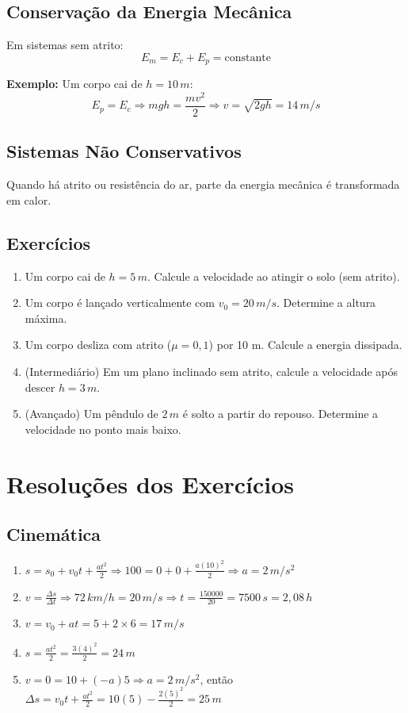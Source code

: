 \documentclass[a4paper,12pt]{article}
\begin{document}
\subsection{Conservação da Energia Mecânica}
Em sistemas sem atrito:
\[
E_m = E_c + E_p = \text{constante}
\]

\textbf{Exemplo:} Um corpo cai de $h=10\,m$:
\[
E_p = E_c \Rightarrow mgh = \frac{mv^2}{2} \Rightarrow v = \sqrt{2gh} = 14\,m/s
\]

\subsection{Sistemas Não Conservativos}
Quando há atrito ou resistência do ar, parte da energia mecânica é transformada em calor.

\subsection{Exercícios}
\begin{enumerate}
\item Um corpo cai de $h=5\,m$. Calcule a velocidade ao atingir o solo (sem atrito).
\item Um corpo é lançado verticalmente com $v_0=20\,m/s$. Determine a altura máxima.
\item Um corpo desliza com atrito ($\mu=0{,}1$) por 10 m. Calcule a energia dissipada.
\item (Intermediário) Em um plano inclinado sem atrito, calcule a velocidade após descer $h=3\,m$.
\item (Avançado) Um pêndulo de $2\,m$ é solto a partir do repouso. Determine a velocidade no ponto mais baixo.
\end{enumerate}

\newpage
\section{Resoluções dos Exercícios}

\subsection{Cinemática}
\begin{enumerate}
\item $s = s_0 + v_0t + \frac{at^2}{2} \Rightarrow 100 = 0 + 0 + \frac{a(10)^2}{2} \Rightarrow a = 2\,m/s^2$
\item $v = \frac{\Delta s}{\Delta t} \Rightarrow 72\,km/h = 20\,m/s \Rightarrow t = \frac{150000}{20} = 7500\,s = 2{,}08\,h$
\item $v = v_0 + at = 5 + 2 \times 6 = 17\,m/s$
\item $s = \frac{at^2}{2} = \frac{3(4)^2}{2} = 24\,m$
\item $v = 0 = 10 + (-a)5 \Rightarrow a=2\,m/s^2$, então $\Delta s = v_0t + \frac{at^2}{2} = 10(5) - \frac{2(5)^2}{2}=25\,m$
\end{enumerate}
\end{document}
